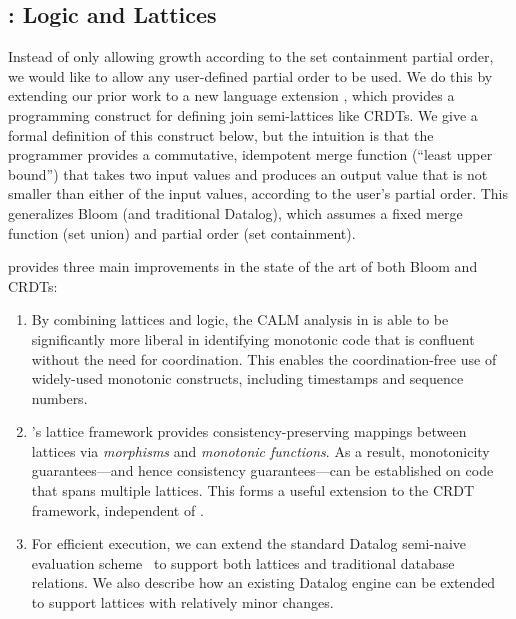 
\subsection{\lang: Logic and Lattices}
Instead of only allowing growth according to the set containment
partial order, we would like to allow any user-defined partial order to be used.  
We do this by extending our prior work to a new language extension \lang, which provides a programming construct for defining join semi-lattices like CRDTs.
We give a
formal definition of this construct below, but the intuition is that the programmer provides a commutative, idempotent merge function (``least upper bound'')
that takes two input values and produces an output value that is not smaller
than either of the input values, according to the user's partial order. This
generalizes Bloom (and traditional Datalog), which assumes a fixed merge
function (set union) and partial order (set containment).

\lang provides three main improvements in the state of the art of both Bloom and CRDTs:  
\begin{enumerate}
\item By combining lattices and logic, the CALM analysis in \lang is able to be significantly more liberal in identifying monotonic code that is confluent without the need for coordination.  This enables the coordination-free use of widely-used monotonic constructs, including timestamps and sequence numbers.
\item {\lang}'s lattice framework provides consistency-preserving mappings between lattices via \emph{morphisms} and \emph{monotonic functions}.  As a result, monotonicity guarantees---and hence consistency guarantees---can be established on code that spans multiple lattices.  This forms a useful extension to the CRDT framework, independent of \lang.
\item For efficient execution, we can extend the standard Datalog semi-naive
evaluation scheme~\cite{Balbin1987} to support both lattices and traditional
database relations. We also describe how an existing Datalog engine can be
extended to support lattices with relatively minor changes.
\end{enumerate}

